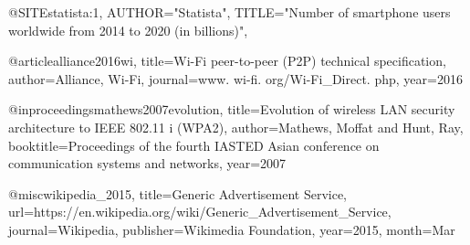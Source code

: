 
@SITE{statista:1,
AUTHOR="Statista",
TITLE="Number of smartphone users worldwide from 2014 to 2020 (in billions)",
}

@article{alliance2016wi,
  title={Wi-Fi peer-to-peer (P2P) technical specification},
  author={Alliance, Wi-Fi},
  journal={www. wi-fi. org/Wi-Fi\_Direct. php},
  year={2016}
}

@inproceedings{mathews2007evolution,
  title={Evolution of wireless LAN security architecture to IEEE 802.11 i (WPA2)},
  author={Mathews, Moffat and Hunt, Ray},
  booktitle={Proceedings of the fourth IASTED Asian conference on communication systems and networks},
  year={2007}
}

@misc{wikipedia_2015, title={Generic Advertisement Service}, url={https://en.wikipedia.org/wiki/Generic_Advertisement_Service}, journal={Wikipedia}, publisher={Wikimedia Foundation}, year={2015}, month={Mar}} 